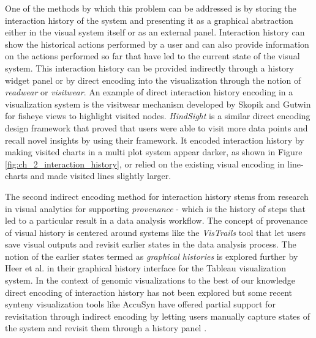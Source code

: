 One of the methods by which this problem can be addressed is by storing the interaction history of the system and presenting it as a graphical abstraction either in the visual system itself or as an external panel. Interaction history can show the historical actions performed by a user and can also provide information on the actions performed so far that have led to the current state of the visual system. This interaction history can be provided indirectly through a history widget panel or by direct encoding into the visualization through the notion of \textit{readwear} or \textit{visitwear}. An example of  direct interaction history encoding in a visualization system is the visitwear mechanism developed by Skopik and Gutwin for fisheye views to highlight visited nodes. \textit{HindSight} is a similar direct encoding design framework that proved that users were able to visit more data points and recall novel insights by using their framework\cite{feng2016hindsight}. It encoded interaction history by making visited charts in a multi plot system appear darker, as shown in Figure \ref{fig:ch_2_interaction_history}, or relied on the existing visual encoding in line-charts and made visited lines slightly larger.

The second indirect encoding method for interaction history stems from research in visual analytics for supporting \textit{provenance} - which is the history of steps that led to a particular result in a data analysis workflow\cite{gotz2009characterizing,freire2008provenance}. The concept of provenance of visual history is centered around systems like the \textit{VisTrails} tool\cite{bavoil2005vistrails} that let users save visual outputs and revisit earlier states in the data analysis process. The notion of the earlier states termed as \textit{graphical histories} is explored further by Heer et al.\cite{heer2008graphical} in their graphical history interface for the Tableau visualization system.
In the context of genomic visualizations to the best of our knowledge direct encoding of interaction  history has not been explored but some recent synteny visualization tools like AccuSyn have offered partial support for revisitation through indirect encoding by letting users manually capture states of the system and revisit them through a history panel \cite{accusyn}.
